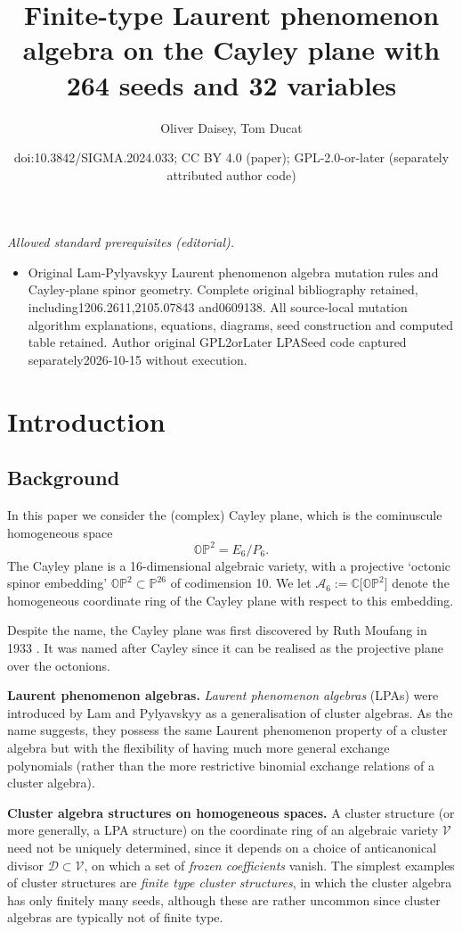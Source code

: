 \documentclass[10pt,a4paper]{amsart}
\title{Finite-type Laurent phenomenon algebra on the Cayley plane with 264 seeds and 32 variables}
\author{Oliver Daisey, Tom Ducat}
\date{doi:10.3842/SIGMA.2024.033; CC BY 4.0 (paper); GPL-2.0-or-later (separately attributed author code)}
\numberwithin{equation}{section}
\theoremstyle{definition}
\newcommand{\CC}{\mathbb{C}}
\begin{document}
\maketitle
\noindent\textit{Allowed standard prerequisites (editorial).}\begin{itemize}
\item Original Lam-Pylyavskyy Laurent phenomenon algebra mutation rules and Cayley-plane spinor geometry. Complete original bibliography retained, including1206.2611,2105.07843 and0609138. All source-local mutation algorithm explanations, equations, diagrams, seed construction and computed table retained. Author original GPL2orLater LPASeed code captured separately2026-10-15 without execution.
\end{itemize}\medskip
\section{Introduction}

\subsection{Background}

In this paper we consider the (complex) Cayley plane, which is the cominuscule homogeneous space \[\mathbb{OP}^2 = E_6/P_6.\] The Cayley plane is a 16-dimensional algebraic variety, with a projective `octonic spinor embedding' $\mathbb{OP}^2\subset \mathbb{P}^{26}$ of codimension 10. We let $\mathcal A_6 := \CC\big[\mathbb{OP}^2\big]$ denote the homogeneous coordinate ring of the Cayley plane with respect to this embedding.

Despite the name, the Cayley plane was first discovered by Ruth Moufang in 1933 \cite{m}. It was named after Cayley since it can be realised as the projective plane over the octonions.

{\bf Laurent phenomenon algebras.}
\emph{Laurent phenomenon algebras} (LPAs) were introduced by Lam and Pylyavskyy \cite{lp} as a generalisation of cluster algebras. As the name suggests, they possess the same Laurent phenomenon property of a cluster algebra but with the flexibility of having much more general exchange polynomials (rather than the more restrictive binomial exchange relations of a cluster algebra).

{\bf Cluster algebra structures on homogeneous spaces.}
A cluster structure (or more generally, a LPA structure) on the coordinate ring of an algebraic variety $\mathcal V$ need not be uniquely determined, since it depends on a choice of anticanonical divisor $\mathcal D\subset \mathcal V$, on which a set of \emph{frozen coefficients} vanish. The simplest examples of cluster structures are \emph{finite type cluster structures}, in which the cluster algebra has only finitely many seeds, although these are rather uncommon since cluster algebras are typically not of finite type.
\end{document}
